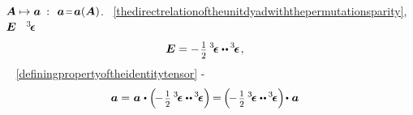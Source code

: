 ~${\hspace{-0.2ex}\bm{A} \mapsto \bm{a}\:: \hspace{.4em} \bm{a} \narroweq \bm{a}(\bm{A})}$.
~\eqref{thedirectrelationoftheunitdyadwiththepermutationsparity},
~${\hspace{-0.1ex}\bm{E}}$
~${\hspace{-0.1ex}{^3\hspace{-0.25ex}\bm{\epsilon}}\hspace{.05ex}}$
%
\begin{equation*}
\UnitDyad = - \hspace{.2ex} \smalldisplaystyleonehalf \hspace{.4ex} \permutationsparitytensor \dotdotp \hspace{-0.1ex} \permutationsparitytensor
\hspace{.2ex} ,
\end{equation*}
%
~
~\eqref{definingpropertyoftheidentitytensor}
\dotproductinquotes\hbox{-}
%
\begin{equation*}
\bm{a}
= \hspace{.1ex}
\tikzmark{beginUnitTensorViaPermutationsParityIsNeutralOnTheRightSide}
\bm{a} \hspace{.1ex} \dotp \left( \hspace{-0.3ex} - \hspace{.2ex} \smalldisplaystyleonehalf \hspace{.4ex} \permutationsparitytensor \dotdotp \hspace{-0.1ex} \permutationsparitytensor \right)
\hspace{-0.6ex} \tikzmark{endUnitTensorViaPermutationsParityIsNeutralOnTheRightSide}
=
\tikzmark{beginUnitTensorViaPermutationsParityIsNeutralOnTheLeftSide} \hspace{-0.6ex}
\left( \hspace{-0.3ex} - \hspace{.2ex} \smalldisplaystyleonehalf \hspace{.4ex} \permutationsparitytensor \dotdotp \hspace{-0.1ex} \permutationsparitytensor \right) \hspace{-0.3ex} \dotp \hspace{.1ex} \bm{a}
\tikzmark{endUnitTensorViaPermutationsParityIsNeutralOnTheLeftSide}
\end{equation*}%
